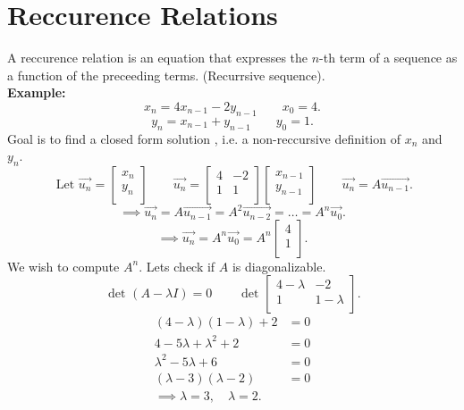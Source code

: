 \documentclass{report}
\begin{document}
   \section{Reccurence Relations}
   A reccurence relation is an equation that expresses the $ n$-th term of a sequence as a function of the preceeding terms. (Recurrsive sequence).\\
   	\textbf{Example:} 
	\[
	x_n = 4 x_{n-1} -2 y _{n-1}  \qquad  x_0 = 4
	.\] 
	\[
	y_n = x_{n-1} + y_{n-1} \qquad y_0 = 1
	.\] 
	Goal is to find a closed form solution , i.e.  a non-reccursive definition of  $ x_n$ and $ y_n$.\\
	\[
	\text{ Let } \vec{ u_n} = \begin{bmatrix}
	x_n\\
	y_n\\
	\end{bmatrix}
	 \qquad  \vec{ u_n} = \begin{bmatrix}
	 4 & -2\\
	 1 & 1\\
	 \end{bmatrix} \begin{bmatrix}
	 x_{n-1}\\
	 y_{n-1}\\
	 \end{bmatrix}
	       \qquad  \vec{ u_n} = A \vec{ u_{n-1}}
	.\] 
	\[
	\implies \vec{ u_n} = A \vec{ u_{n-1}} = A ^2 \vec{ u_{n-2}} = \ldots = A ^n \vec{ u_0}
	.\] 
	\[
	\implies \vec{ u_n} = A ^n \vec{ u_0} = A ^n \begin{bmatrix}
	4\\
	1\\
	\end{bmatrix}
	.\] 
         We wish to compute $ A^{n}$. Lets check if $ A$ is diagonalizable.\\
	 \[
	 \text{ det }  \left( A - \lambda I \right) =0 \qquad  \text{ det } \begin{bmatrix}
	 4-\lambda & -2\\
	 1 & 1-\lambda\\
	 \end{bmatrix}
	 .\] 
	 \begin{align*}
	 	\left( 4-\lambda \right) \left( 1-\lambda  \right) +2 & = 0\\
		4 -5\lambda + \lambda ^2 +2 & = 0\\
		\lambda ^2 -5 \lambda +6 & = 0\\
		\left( \lambda-3 \right) \left( \lambda -2 \right) &=0\\
		\implies \lambda =3 , \quad \lambda =2
	 .\end{align*}
\end{document}
